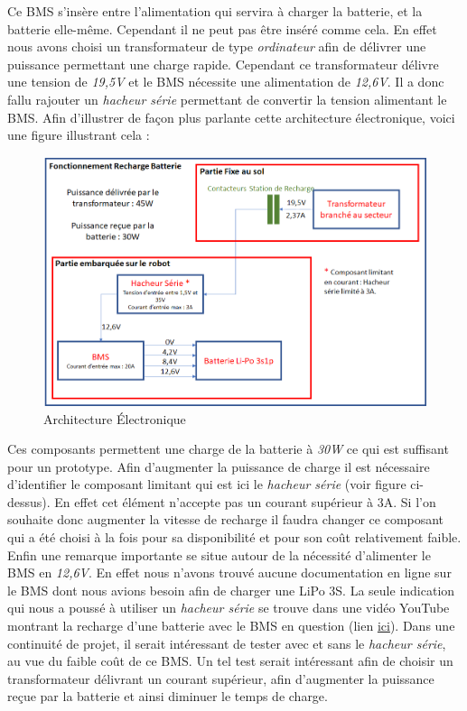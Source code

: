 \documentclass[french]{rapportENSTAB}
\begin{document}
Ce BMS s'insère entre l'alimentation qui servira à charger la batterie, et la batterie elle-même. Cependant il ne peut pas être inséré comme cela. En effet nous avons choisi un transformateur de type \textit{ordinateur} afin de délivrer une puissance permettant une charge rapide. Cependant ce transformateur délivre une tension de \textit{19,5V} et le BMS nécessite une alimentation de \textit{12,6V}. Il a donc fallu rajouter un \textit{hacheur série} permettant de convertir la tension alimentant le BMS. Afin d'illustrer de façon plus parlante cette architecture électronique, voici une figure illustrant cela :
\begin{figure}[H]
    \centering
    \includegraphics[scale=0.75]{images/station de recharge/Archi 2.png}
    \caption{Architecture Électronique}
    \label{fig:archi elec}
\end{figure}

Ces composants permettent une charge de la batterie à \textit{30W} ce qui est suffisant pour un prototype. Afin d'augmenter la puissance de charge il est nécessaire d'identifier le composant limitant qui est ici le \textit{hacheur série} (voir figure ci-dessus). En effet cet élément n'accepte pas un courant supérieur à 3A. Si l'on souhaite donc augmenter la vitesse de recharge il faudra changer ce composant qui a été choisi à la fois pour sa disponibilité et pour son coût relativement faible.\\

Enfin une remarque importante se situe autour de la nécessité d'alimenter le BMS en \textit{12,6V}. En effet nous n'avons trouvé aucune documentation en ligne sur le BMS dont nous avions besoin afin de charger une LiPo 3S. La seule indication qui nous a poussé à utiliser un \textit{hacheur série} se trouve dans une vidéo YouTube montrant la recharge d'une batterie avec le BMS en question (lien \href{https://www.youtube.com/watch?v=ySXtBuawf70}{ici}). Dans une continuité de projet, il serait intéressant de tester avec et sans le \textit{hacheur série}, au vue du faible coût de ce BMS. Un tel test serait intéressant afin de choisir un transformateur délivrant un courant supérieur, afin d'augmenter la puissance reçue par la batterie et ainsi diminuer le temps de charge.
\end{document}
